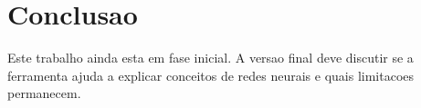 \section{Conclusao}

Este trabalho ainda esta em fase inicial. A versao final deve discutir se a
ferramenta ajuda a explicar conceitos de redes neurais e quais limitacoes
permanecem.

